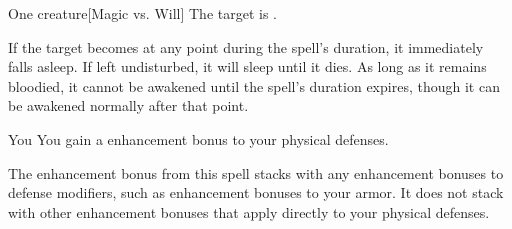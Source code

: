 \begin{spellheader}
    \spellrng{\rngmed}
    \spelldur{\durlong}
\end{spellheader}
\begin{spelleffects}
    \begin{spelltarget}{One creature}[Magic vs. Will]
        \spellsuccess The target is \bewildered.

        If the target becomes \bloodied at any point during the spell's duration, it immediately falls asleep. If left undisturbed, it will sleep until it dies. As long as it remains bloodied, it cannot be awakened until the spell's duration expires, though it can be awakened normally after that point.
    \end{spelltarget}
\end{spelleffects}
\begin{spellfooter}
    
\end{spellfooter}

\begin{spellheader}
    \spelldur{\durlong}
\end{spellheader}
\begin{spelleffects}
    \begin{spelltarget}{You}
        \spelleffect You gain a  enhancement bonus to your physical defenses. \spellbonusscalingdescription
    \end{spelltarget}
\end{spelleffects}
\begin{spellfooter}
    \spellnotes The enhancement bonus from this spell stacks with any enhancement bonuses to defense modifiers, such as enhancement bonuses to your armor. It does not stack with other enhancement bonuses that apply directly to your physical defenses. 
\end{spellfooter}

